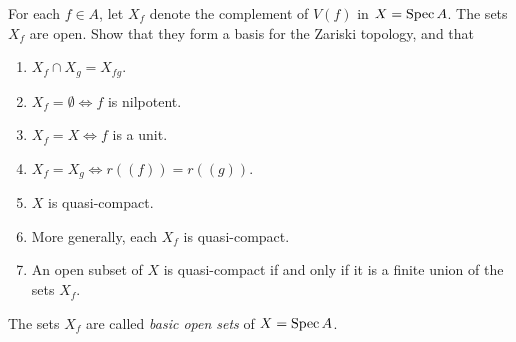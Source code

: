 \documentclass[11pt, english]{article}
\begin{document}
\begin{exc}[Exercise 17]
For each $f \in A$, let $X_f$ denote the complement of $V(f)$ in $X=\operatorname{Spec} A$. The sets $X_f$ are open. Show that they form a basis for the Zariski topology, and that
\begin{enumerate}
\item $X_f \cap X_g = X_{fg}$.
\item $X_f = \emptyset \Leftrightarrow f$ is nilpotent.
\item $X_f = X \Leftrightarrow f$ is a unit.
\item $X_f = X_g \Leftrightarrow r((f)) = r((g))$.
\item $X$ is quasi-compact.
\item More generally, each $X_f$ is quasi-compact.
\item An open subset of $X$ is quasi-compact if and only if it is a finite union of the sets $X_f$.
\end{enumerate}
The sets $X_f$ are called \emph{basic open sets} of $X=\operatorname{Spec} A$.
\end{exc}
\end{document}
